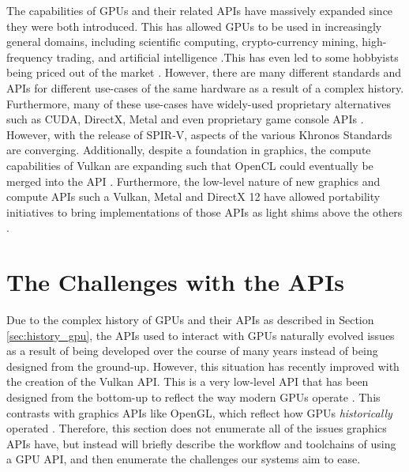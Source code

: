 \documentclass[a4paper,12pt,twoside,openright]{report}
\begin{document}
The capabilities of GPUs and their related APIs have massively expanded since
they were both introduced. This has allowed GPUs to be used in increasingly
general domains, including scientific computing, crypto-currency mining,
high-frequency trading, and artificial intelligence \cite{GPUCrypto}
\cite{GPUScientificComputing} \cite{GPUTrading} \cite{GPUAI}.This has even led
to some hobbyists being priced out of the market \cite{GPUCrypto}
\cite{BitcoinRuiningPricing}. However, there are many different standards and
APIs for different use-cases of the same hardware as a result of a complex
history. Furthermore, many of these use-cases have widely-used proprietary
alternatives such as CUDA, DirectX, Metal and even proprietary game console
APIs \cite{CUDA} \cite{Metal} \cite{Direct3D} \cite{PS4PortCrew}. However, with
the release of SPIR-V, aspects of the various Khronos Standards are converging.
Additionally, despite a foundation in graphics, the compute capabilities of
Vulkan are expanding such that OpenCL could eventually be merged into the API
\cite{VulkanOpenCLMerge}. Furthermore, the low-level nature of new graphics and
compute APIs such a Vulkan, Metal and DirectX 12 have allowed portability
initiatives to bring implementations of those APIs as light shims above the
others \cite{VulkanPortabilityInitiative}
\cite{VulkanPortabilityInitiativeAnnouncement}.

\section{The Challenges with the APIs}

\label{sec:api_challanges}



Due to the complex history of GPUs and their APIs as described in Section
\ref{sec:history_gpu}, the APIs used to interact with GPUs naturally evolved
issues as a result of being developed over the course of many years instead of
being designed from the ground-up. However, this situation has recently
improved with the creation of the Vulkan API. This is a very low-level API that
has been designed from the bottom-up to reflect the way modern GPUs operate
\cite{Vulkan}. This contrasts with graphics APIs like OpenGL, which reflect how
GPUs \textit{historically} operated \cite{TODO}. Therefore, this section does
not enumerate all of the issues graphics APIs have, but instead will briefly
describe the workflow and toolchains of using a GPU API, and then enumerate the
challenges our systems aim to ease.
\end{document}

